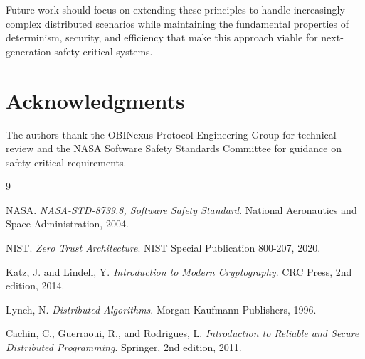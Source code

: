 \documentclass[11pt,a4paper]{article}
\theoremstyle{definition}
\theoremstyle{remark}
\begin{document}
Future work should focus on extending these principles to handle increasingly complex distributed scenarios while maintaining the fundamental properties of determinism, security, and efficiency that make this approach viable for next-generation safety-critical systems.

\section*{Acknowledgments}

The authors thank the OBINexus Protocol Engineering Group for technical review and the NASA Software Safety Standards Committee for guidance on safety-critical requirements.


\begin{thebibliography}{9}

NASA.
\textit{NASA-STD-8739.8, Software Safety Standard}.
National Aeronautics and Space Administration, 2004.

NIST.
\textit{Zero Trust Architecture}.
NIST Special Publication 800-207, 2020.

Katz, J. and Lindell, Y.
\textit{Introduction to Modern Cryptography}.
CRC Press, 2nd edition, 2014.

Lynch, N.
\textit{Distributed Algorithms}.
Morgan Kaufmann Publishers, 1996.

Cachin, C., Guerraoui, R., and Rodrigues, L.
\textit{Introduction to Reliable and Secure Distributed Programming}.
Springer, 2nd edition, 2011.

\end{thebibliography}
\end{document}
